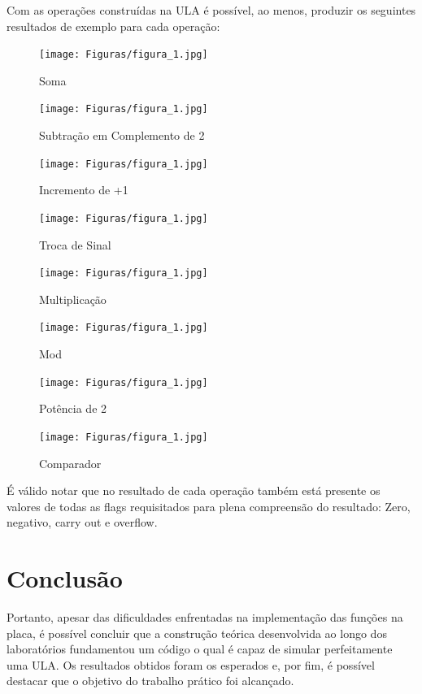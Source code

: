 \documentclass[a4paper, 12pt]{article}
\begin{document}
Com as operações construídas na ULA é possível, ao menos, produzir os seguintes resultados de exemplo para cada operação:

\begin{figure}[H]
\caption{Soma}

\centering
\texttt{[image: Figuras/figura\_1.jpg]}
\label{figura:qualquernome}
\end{figure}

\begin{figure}[H]
\caption{Subtração em Complemento de 2}

\centering
\texttt{[image: Figuras/figura\_1.jpg]}
\label{figura:qualquernome}
\end{figure}

\begin{figure}[H]
\caption{Incremento de +1}

\centering
\texttt{[image: Figuras/figura\_1.jpg]}
\label{figura:qualquernome}
\end{figure}

\begin{figure}[H]
\caption{Troca de Sinal}

\centering
\texttt{[image: Figuras/figura\_1.jpg]}
\label{figura:qualquernome}
\end{figure}

\begin{figure}[H]
\caption{Multiplicação}

\centering
\texttt{[image: Figuras/figura\_1.jpg]}
\label{figura:qualquernome}
\end{figure}

\begin{figure}[H]
\caption{Mod}

\centering
\texttt{[image: Figuras/figura\_1.jpg]}
\label{figura:qualquernome}
\end{figure}

\begin{figure}[H]
\caption{Potência de 2}

\centering
\texttt{[image: Figuras/figura\_1.jpg]}
\label{figura:qualquernome}
\end{figure}

\begin{figure}[H]
\caption{Comparador}

\centering
\texttt{[image: Figuras/figura\_1.jpg]}
\label{figura:qualquernome}
\end{figure}

É válido notar que no resultado de cada operação também está presente os valores de todas as flags requisitados para plena compreensão do resultado: Zero, negativo, carry out e overflow.

\section{Conclusão}

Portanto, apesar das dificuldades enfrentadas na implementação das funções na placa, é possível concluir que a construção teórica desenvolvida ao longo dos laboratórios fundamentou um código o qual é capaz de simular perfeitamente uma ULA. Os resultados obtidos foram os esperados e, por fim, é possível destacar que o objetivo do trabalho prático foi alcançado.
\end{document}
